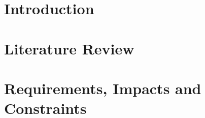 \documentclass[Times,12pt,oneside,openany,print,index]{report}
\let\cleardoublepage=\clearpage %
\begin{document}
\thispagestyle{empty} %
\cleardoublepage


{}


{}


{}


{}


\renewcommand{\contentsname}{Table of Contents} %
\cleardoublepage
{}
{} %
\tableofcontents %

\listoffigures %
\listoftables %

\cleardoublepage


\chapter{Introduction}
\label{chap:intro}


\chapter{Literature Review}
\label{chap:litreview}


\chapter{Requirements, Impacts and Constraints}
\label{chap:requirements}

\end{document}
